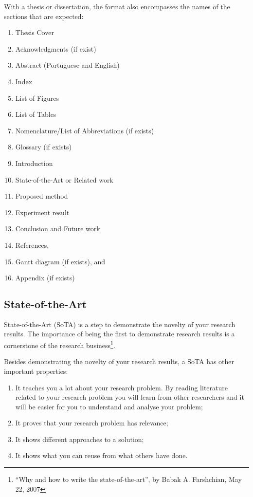 With a thesis or dissertation, the format also encompasses the names of the sections that are expected: 
\begin{enumerate}
\item Thesis Cover
\item Acknowledgments (if exist)
\item Abstract (Portuguese and English)
\item Index
\item List of Figures
\item List of Tables
\item Nomenclature/List of Abbreviations (if exists)
\item Glossary (if exists)
\item Introduction
\item State-of-the-Art or Related work
\item Proposed method
\item Experiment result
\item Conclusion and Future work
\item References, 
\item Gantt diagram (if exists), and 
\item Appendix (if exists)
\end{enumerate}
 
\subsection{State-of-the-Art}
\label{sec:state}

State-of-the-Art (SoTA) is a step to demonstrate the novelty of your research results. The importance of being the first to demonstrate research results is a cornerstone of the research business\footnote{``Why and how to write the state-of-the-art'', by Babak A. Farshchian, May 22, 2007}. 

Besides demonstrating the novelty of your research results, a SoTA has other important properties:
\begin{enumerate}
\item It teaches you a lot about your research problem. By reading literature related to your research problem you will learn from other researchers and it will be easier for you to understand and analyse your problem;
\item It proves that your research problem has relevance;
\item It shows different approaches to a solution;
\item It shows what you can reuse from what others have done. 
\end{enumerate}
 
